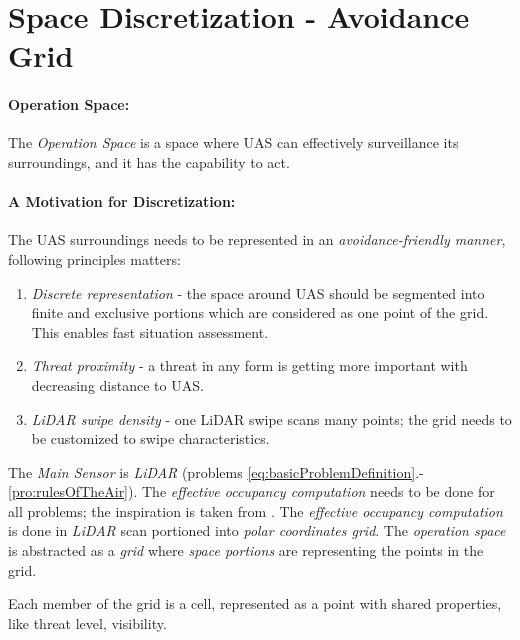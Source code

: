 \cleardoublepage
\section{Space Discretization - Avoidance Grid}\label{s:AvoidanceGrid}

\paragraph{Operation Space:} The \emph{Operation Space} is a space where UAS can effectively surveillance its surroundings, and it has the capability to act.

\paragraph{A Motivation for Discretization:} The UAS surroundings needs to be represented in an \emph{avoidance-friendly manner}, following principles matters:

\begin{enumerate}
	\item \emph{Discrete representation} - the space around UAS should be segmented into finite and exclusive portions which are considered as one point of the grid. This enables fast situation assessment. 
	
	\item \emph{Threat proximity} - a threat in any form is getting more important with decreasing distance to UAS.
	
	\item \emph{LiDAR swipe density} - one LiDAR swipe scans many points; the grid needs to be customized to swipe characteristics.
\end{enumerate}


The \emph{Main Sensor} is \emph{LiDAR} (problems \ref{eq:basicProblemDefinition}.-\ref{pro:rulesOfTheAir}).  The \emph{effective occupancy computation} needs to be done for all problems; the inspiration is taken from \cite{homm2010efficient}.  The \emph{effective occupancy computation} is done in \emph{LiDAR} scan  portioned into \emph{polar coordinates grid}. The \emph{operation space} is abstracted as a \emph{grid} where \emph{space portions} are representing the points in the grid.

\begin{note}
	Each member of the grid is a cell, represented as a point with shared properties, like threat level, visibility.
\end{note}

